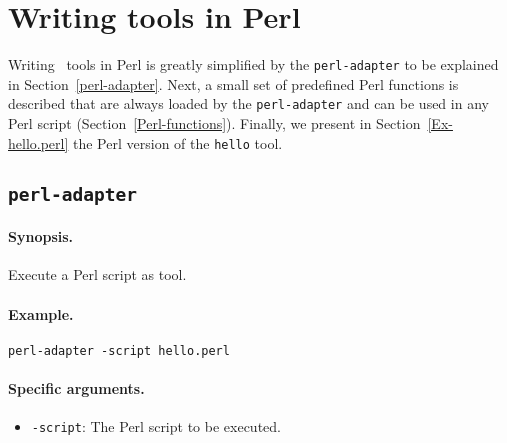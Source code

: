 
\section{\label{ToolsInPerl}Writing tools in Perl}

Writing \TB\ tools in Perl is greatly simplified by the {\tt perl-adapter}
to be explained in Section~\ref{perl-adapter}.
Next, a small set of predefined Perl functions is described that are
always loaded by the {\tt perl-adapter} and can be used in any Perl script
(Section~\ref{Perl-functions}).
Finally, we present in Section~\ref{Ex-hello.perl} the Perl version
of the {\tt hello} tool.

\subsection{\label{perl-adapter}{\tt perl-adapter}}

\paragraph{Synopsis.} Execute a Perl script as tool.

\paragraph{Example.} {\tt perl-adapter -script hello.perl}

\paragraph{Specific arguments.}
\begin{itemize}
\item {\tt -script}: The Perl script to be executed.
\end{itemize}

